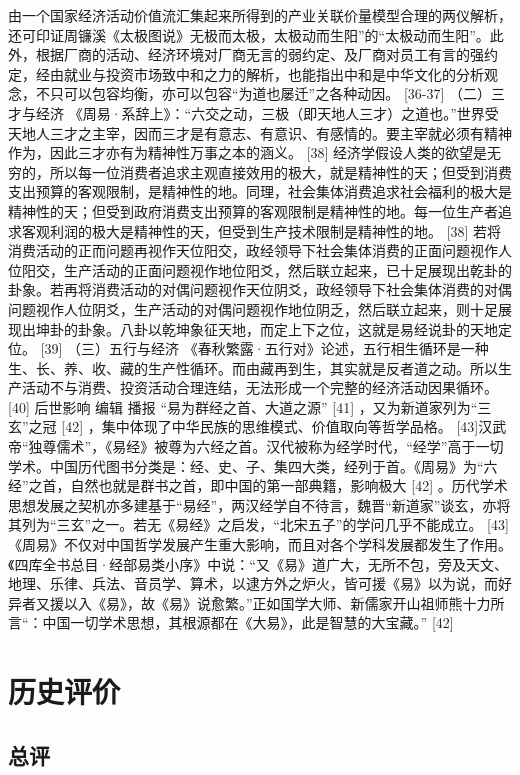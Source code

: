 \documentclass[12pt,UTF8]{ctexbook}
\begin{document}
由一个国家经济活动价值流汇集起来所得到的产业关联价量模型合理的两仪解析，还可印证周镰溪《太极图说》无极而太极，太极动而生阳”的“太极动而生阳”。此外，根据厂商的活动、经济环境对厂商无言的弱约定、及厂商对员工有言的强约定，经由就业与投资市场致中和之力的解析，也能指出中和是中华文化的分析观念，不只可以包容均衡，亦可以包容“为道也屡迁”之各种动因。 [36-37]
（二）三才与经济
《周易·系辞上》：“六交之动，三极（即天地人三才）之道也。”世界受天地人三才之主宰，因而三才是有意志、有意识、有感情的。要主宰就必须有精神作为，因此三才亦有为精神性万事之本的涵义。 [38]
经济学假设人类的欲望是无穷的，所以每一位消费者追求主观直接效用的极大，就是精神性的天；但受到消费支出预算的客观限制，是精神性的地。同理，社会集体消费追求社会福利的极大是精神性的天；但受到政府消费支出预算的客观限制是精神性的地。每一位生产者追求客观利润的极大是精神性的天，但受到生产技术限制是精神性的地。 [38]
若将消费活动的正而问题再视作天位阳交，政经领导下社会集体消费的正面问题视作人位阳交，生产活动的正面问题视作地位阳爻，然后联立起来，已十足展现出乾卦的卦象。若再将消费活动的对偶问题视作天位阴爻，政经领导下社会集体消费的对偶问题视作人位阴爻，生产活动的对偶问题视作地位阴乏，然后联立起来，则十足展现出坤卦的卦象。八卦以乾坤象征天地，而定上下之位，这就是易经说卦的天地定位。 [39]
（三）五行与经济
《春秋繁露·五行对》论述，五行相生循环是一种生、长、养、收、藏的生产性循环。而由藏再到生，其实就是反者道之动。所以生产活动不与消费、投资活动合理连结，无法形成一个完整的经济活动因果循环。 [40]
后世影响
编辑
播报
“易为群经之首、大道之源” [41]
，又为新道家列为“三玄”之冠 [42] ，集中体现了中华民族的思维模式、价值取向等哲学品格。 [43]汉武帝“独尊儒术”，《易经》被尊为六经之首。汉代被称为经学时代，“经学”高于一切学术。中国历代图书分类是：经、史、子、集四大类，经列于首。《周易》为“六经”之首，自然也就是群书之首，即中国的第一部典籍，影响极大 [42] 。历代学术思想发展之契机亦多建基于“易经”，两汉经学自不待言，魏晋“新道家”谈玄，亦将其列为“三玄”之一。若无《易经》之启发，“北宋五子”的学问几乎不能成立。 [43]《周易》不仅对中国哲学发展产生重大影响，而且对各个学科发展都发生了作用。《四库全书总目·经部易类小序》中说：“又《易》道广大，无所不包，旁及天文、地理、乐律、兵法、音员学、算术，以逮方外之炉火，皆可援《易》以为说，而好异者又援以入《易》，故《易》说愈繁。”正如国学大师、新儒家开山祖师熊十力所言“：中国一切学术思想，其根源都在《大易》，此是智慧的大宝藏。” [42]

\section{历史评价}

\subsection{总评}
\end{document}
